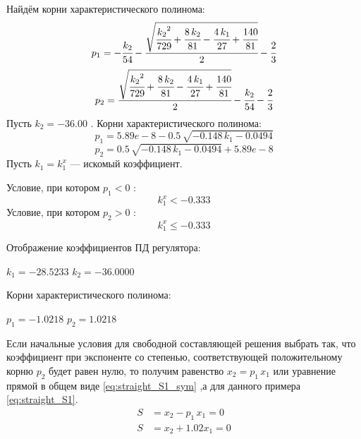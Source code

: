 Найдём корни характеристического полинома:
\begin{equation}p_1=
-\cfrac{k_{2}}{54}-\cfrac{\sqrt{\cfrac{{k_{2}}^2}{729}+\cfrac{8\,k_{2}}{81}-\cfrac{4\,k_{1}}{27}+\cfrac{140}{81}}}{2}-\cfrac{2}{3}
\end{equation}
\begin{equation}p_2=
\cfrac{\sqrt{\cfrac{{k_{2}}^2}{729}+\cfrac{8\,k_{2}}{81}-\cfrac{4\,k_{1}}{27}+\cfrac{140}{81}}}{2}-\cfrac{k_{2}}{54}-\cfrac{2}{3}
\end{equation}
Пусть $k_2=-36.00$
. Корни характеристического полинома:
\begin{equation}p_1=
5.89e-8-0.5\,\sqrt{-0.148\,k_{1}-0.0494}
\end{equation}
\begin{equation}p_2=
0.5\,\sqrt{-0.148\,k_{1}-0.0494}+5.89e-8
\end{equation}
Пусть $k_1=k_1^x  $ --- искомый коэффициент.

Условие, при котором $p_1<0$ :
\begin{equation}
k_1^x<-0.333
\end{equation}
Условие, при котором $p_2>0$ :
\begin{equation}
k_1^x\leq -0.333
\end{equation}

Отображение коэффициентов ПД регулятора:

$k_1=-28.5233$
$k_2=-36.0000$

Корни характеристического полинома:

$p_1=-1.0218$
$p_2=1.0218$

Если начальные условия для свободной составляющей решения выбрать так, что коэффициент 
при экспоненте со степенью, соответствующей положительному корню $p_2$ будет равен нулю, то 
получим равенство $x_2=p_1 \, x_1$ или уравнение прямой в общем виде \eqref{eq:straight_S1_sym}
,а для данного примера \eqref{eq:straight_S1}.
\begin{align}
S&=x_2-p_1\,x_1=0 \label{eq:straight_S1_sym} \\
S&=x_2+
1.02x_1=0
\label{eq:straight_S1}  
\end{align}

